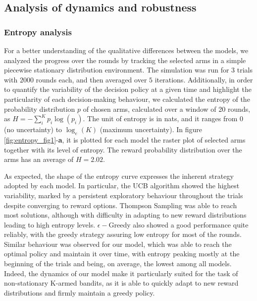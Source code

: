 \subsection{Analysis of dynamics and robustness}

\subsubsection{Entropy analysis}\label{sec:entropy}
\noindent For a better understanding of the qualitative differences between the models, we analyzed the progress over the rounds by tracking the selected arms in a simple piecewise stationary distribution environment.
The simulation was run for $3$ trials with $2000$ rounds each, and then averaged over $5$ iterations.
Additionally, in order to quantify the variability of the decision policy at a given time and highlight the particularity of each decision-making behaviour, we calculated the entropy of the probability distribution $p$ of chosen arms, calculated over a window of 20 rounds, as $H=-\sum^{K}_{i} p_{i}\log(p_{i})$.
The unit of entropy is in nats, and it ranges from $0$ (no uncertainty) to $\log_{e}(K)$ (maximum uncertainty).
In figure \ref{fig:entropy_fig1}-\textbf{a}, it is plotted for each model the raster plot of selected arms together with its level of entropy. The reward probability distribution over the arms has an average of $H=2.02$.

As expected, the shape of the entropy curve expresses the inherent strategy adopted by each model.
In particular, the UCB algorithm showed the highest variability, marked by a persistent exploratory behaviour throughout the trials despite converging to reward options. Thompson Sampling was able to reach most solutions, although with difficulty in adapting to new reward distributions
leading to high entropy levels.
$\epsilon-$Greedy also showed a good performance quite reliably, with the greedy strategy assuring low entropy for most of the rounds.
Similar behaviour was observed for our model, which was able to reach the optimal policy and maintain it over time, with entropy peaking mostly at the beginning of the trials and being, on average, the lowest among all models.
Indeed, the dynamics of our model make it particularly suited for the task of non-stationary K-armed bandits, as it is able to quickly adapt to new reward distributions and firmly maintain a greedy policy.

